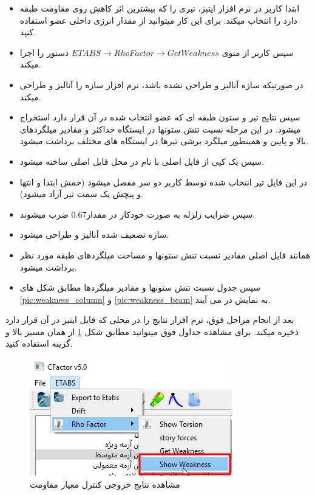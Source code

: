 \begin{itemize}
    \item ابتدا کاربر در نرم افزار ایتبز، تیری را که بیشترین اثر کاهش روی مقاومت طبقه دارد را انتخاب میکند. برای این کار میتوانید از مقدار انرژی داخلی عضو استفاده کنید.
    \item سپس کاربر از منوی $ETABS \rightarrow Rho Factor \rightarrow Get Weakness$ دستور را اجرا میکند.
    \item در صورتیکه سازه آنالیز و طراحی نشده باشد، نرم افزار سازه را آنالیز و طراحی میکند.
    \item سپس نتایج تیر و ستون طبقه ای که عضو انتخاب شده در آن قرار دارد استخراج میشود. در این مرحله نسبت تنش ستونها در ایستگاه حداکثر و مقادیر میلگردهای بالا و پایین و همینطور میلگرد برشی تیرها در ایستگاه های مختلف برداشت میشود.
    \item سپس یک کپی از فایل اصلی با نام  در محل فایل اصلی ساخته میشود.
    \item در این فایل تیر انتخاب شده توسط کاربر دو سر مفصل میشود (خمش ابتدا و انتها و پیچش یک سمت تیر آزاد میشود).
    \item سپس ضرایب زلزله به صورت خودکار در مقدار$0.67$ ضرب میشوند.
    \item سازه تضعیف شده آنالیز و طراحی میشود.
    \item همانند فایل اصلی مقادیر نسبت تنش ستونها و مساحت میلگردهای طبقه مورد نظر برداشت میشود.
    \item سپس جدول نسبت تنش ستونها و مقادیر میلگردها مطابق شکل های \ref{pic:weakness_column} و \ref{pic:weakness_beam} به نمایش در می آیند.
\end{itemize}

بعد از انجام مراحل فوق، نرم افزار نتایج را در محلی که فایل ایتبز در آن قرار دارد ذخیره میکند. برای مشاهده جداول فوق میتوانید مطابق شکل
\ref{pic:show_weakness}
از همان مسیر بالا و گزینه 
استفاده کنید.

\begin{figure}[H]
    \centering
    \includegraphics[scale=.7]{figures/show_weakness}
    \caption{مشاهده نتایج خروجی کنترل معیار مقاومت}
    \label{pic:show_weakness}
    
\end{figure}


